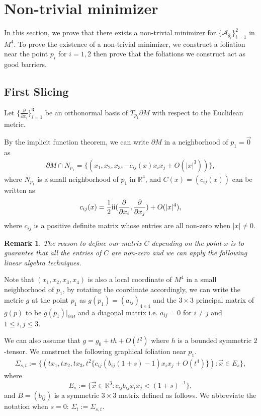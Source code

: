 \documentclass[11pt,letterpaper]{amsart}
\newcommand{\RN}[1]{%
  \textup{\uppercase\expandafter{\romannumeral#1}}%
}
\newtheorem{rem}{Remark}[section]
\begin{document}
\section{Non-trivial minimizer}
In this section, we prove that there exists a non-trivial minimizer for $\{\mathcal{A}_{\bar{\theta}_{i}}\}_{i=1}^{2}$ in $M^{4}$. To prove the existence of a non-trivial minimizer, we construct a foliation near the point $p_i$ for $i=1,2$ then prove that the foliations we construct act as good barriers.

\subsection{First Slicing}
Let $\{\frac{\partial}{\partial x_i}\}_{i=1}^{3}$ be an orthonormal basis of $T_{p_1}\partial M$ with respect to the Euclidean metric. 

By the implicit function theorem, we can write $\partial M$ in a neighborhood of $p_1=\vec{0}$ as
\begin{align} \label{boundarygraph}
    \partial M\cap N_{p_1}= \{(x_1,x_2,x_{3},-c_{ij}(x)x_ix_j+O(|x|^3))\},
\end{align}
where $N_{p_1}$ is a small neighborhood of $p_1$ in $\mathbb R^{4}$, and $C(x)=(c_{ij}(x))$ can be written as
\[
c_{ij}(x)=\frac{1}{2}\RN{2}(\frac{\partial}{\partial x_i},\frac{\partial}{\partial x_j})+O(|x|^4),
\]
where $c_{ij}$ is a positive definite matrix whose entries are all non-zero when $|x|\neq 0$.

\begin{rem}
    The reason to define our matrix $C$ depending on the point $x$ is to guarantee that all the entries of $C$ are non-zero and we can apply the following linear algebra techniques. 
\end{rem}

Note that $(x_1,x_2,x_3,x_4)$ is also a local coordinate of $M^{4}$ in a small neighborhood of $p_1$, by rotating the coordinate accordingly, we can write the metric $g$  at the point $p_1$ as $g(p_1)= (a_{ij})_{4\times 4}$ and the $3 \times 3$ principal matrix of $g(p)$ to be $g(p_{1})|_{\partial M}$ and a diagonal matrix i.e. $a_{ij}=0$ for $i \neq j$ and $1 \le i, j \le 3$.

We can also assume that $g= g_{0}+th+O(t^{2})$ where $h$ is a bounded symmetric $2$-tensor. We construct the following graphical foliation near $p_1$.
\begin{align} \label{foliationgraph}
    \Sigma_{s,t}:=\{(tx_1,tx_2,tx_{3}, t^2\{c_{ij}\left(b_{ij}(1+s)-1\right) x_{i} x_{j}+O(t^4)\}): \vec{x}\in E_s\},
\end{align}
where 
\[
E_s:=\{\vec{x}\in\mathbb R^{3}: c_{ij}b_{ij}x_ix_j<(1+s)^{-1}\},
\]
and $B=(b_{ij})$ is a symmetric $3\times 3$ matrix defined as follows. We abbreviate the notation when $s=0$: $\Sigma_{t} := \Sigma_{s,t}$.
\end{document}
